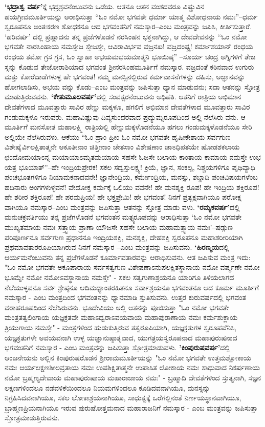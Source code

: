 \textbf{‘ಭದ್ರಾಶ್ವ ವರ್ಷ’}ಕ್ಕೆ ಭದ್ರಶ್ರವನೆಂಬುವನು ಒಡೆಯ. ಆತನೂ ಆತನ ವಂಶದವರೂ ವಿಷ್ಣುವಿನ ಹಯಗ್ರೀವಮೂರ್ತಿಯನ್ನು ಆರಾಧಿಸುತ್ತಾ “ಓಂ ನಮೋ ಭಗವತೇ ಧರ್ಮಾ ಯಾತ್ಮ ವಿಶೋಧನಾಯ ನಮಃ”–ಧರ್ಮ ಸ್ವರೂಪನೂ ಅಂತಃಕರಣ ಶೋಧಕನೂ ಆದ ಭಗವಂತನಿಗೆ ನಮಸ್ಕಾರ–ಎಂಬ ಮಂತ್ರವನ್ನು ಜಪಿಸಿ, ಕೀರ್ತಿಸುತ್ತಾರೆ. ‘ಹರಿವರ್ಷ’ ದಲ್ಲಿ ಪ್ರಹ್ಲಾದನು ತನ್ನ ಪ್ರಜೆಗಳೊಡನೆ ನರಸಿಂಹನ ಭಕ್ತನಾಗಿದ್ದು, ಆ ದೇವದೇವನನ್ನು “ಓಂ ನಮೋ ಭಗವತೇ ನಾರಸಿಂಹಾಯ ನಮಸ್ತೇಜ ಸ್ತೇಜಸ್ತೇ, ಆವಿರಾವಿರ್ಭವ ವಜ್ರನಖ! ವಜ್ರದಂಷ್ಟ್ರ! ಕರ್ಮಾಶಯಾನ್ ರಂಧಯ ರಂಧಯ ತಮೋ ಗ್ರಸ ಗ್ರಸ, ಓಂ ಸ್ವಾಹಾ ಅಭಯಮಭಯಮಾತ್ಮನಿ ಭೂಯಿಷ್ಠ” –ಸೂರ್ಯ ಚಂದ್ರ ಅಗ್ನಿಗಳಿಗೆ ತೇಜ ಸ್ಸನ್ನು ಕೊಡುವ ತೇಜೋರಾಶಿಯಾದ ಭಗವಂತ ಶ್ರೀನರಸಿಂಹಮೂರ್ತಿಗೆ ನಮಸ್ಕಾರ. ವಜ್ರದಂತೆ ಕಠಿನವಾದ ಉಗುರು ಮತ್ತು ಕೋರೆದಾಡೆಗಳುಳ್ಳ ಹೇ ಭಗವಂತ! ನಮ್ಮ ಮನಸ್ಸಿನಲ್ಲಿರುವ ಕರ್ಮವಾಸನೆಗಳನ್ನು ದಹಿಸು, ಅಜ್ಞಾನವನ್ನು ಹೋಗಲಾಡಿಸು, ಅಭಯ ವನ್ನು ಕೊಡು–ಎಂಬ ಮಂತ್ರವನ್ನು ಜಪಿಸುತ್ತಾ ಧ್ಯಾನ ಮಾಡುವನು; ಸದಾ ಆತನನ್ನು ಸ್ತೋತ್ರ ಮಾಡುತ್ತಿರುವವನು. \textbf{‘ಕೇತುಮೂಲವರ್ಷ’}ದಲ್ಲಿ ಸಂವತ್ಸರನೆಂಬುವನು ಅಧಿಪತಿ. ಆತನಿಗೆ ರಾತ್ರಿಯ ಅಭಿಮಾನ ದೇವತೆಗಳಾದ ಮೂವತ್ತಾರು ಸಾವಿರ ಹೆಣ್ಣು ಮಕ್ಕಳೂ, ಹಗಲಿಗೆ ಅಭಿಮಾನ ದೇವತೆಗಳಾದ ಮೂವತ್ತಾರು ಸಾವಿರ ಗಂಡುಮಕ್ಕಳೂ ಇರುವರು. ಮಹಾವಿಷ್ಣುವು ದಿವ್ಯಸುಂದರವಾದ ಪ್ರದ್ಯುಮ್ನರೂಪದಿಂದ ಅಲ್ಲಿ ನೆಲೆಸಿರು ವನು. ಆ ಮೂರ್ತಿಗೆ ಮನಸೋತ ಮಹಾಲಕ್ಷ್ಮಿ ರಾತ್ರಿಯಲ್ಲಿ ಹೆಣ್ಣುಮಕ್ಕಳೊಡನೆಯೂ ಹಗಲು ಗಂಡುಮಕ್ಕಳೊಡನೆಯೂ ಸೇರಿ ಅಲ್ಲಿಯೇ ನೆಲೆಸಿರುವಳು. ಆಕೆಯು “ಓಂ ಹ್ರಾಂ ಹ್ರೀಂ ಓಂ ನಮೋ ಭಗವತೇ ಹೃಷೀಕೇಶಾಯ ಸರ್ವಗುಣ ವಿಶೇಷೈರ್ವಿಲಕ್ಷಿತಾತ್ಮನೇ ಆಕೂತೀನಾಂ ಚಿತ್ತೀನಾಂ ಚೇತಸಾಂ ವಿಶೇಷಣಾಂ ಚಾಽಧಿಪತಯೇ ಷೋಡಶಕಲಾಯ ಛಂದೋಮಯಾಽನ್ನ ಮಯಾಯಾಽಮೃತಮಯಾಯ ಸಹಸೇ ಓಜಸೇ ಬಲಾಯ ಕಾಂತಾಯ ಕಾಮಾಯ ನಮಸ್ತೇ ಉಭ ಯತ್ರ ಭೂಯಾತ್​”–ಹೇ ಇಂದ್ರಿಯಪ್ರೇರಕ! ಸಕಲ ಸದ್ವಸ್ತುಲಕ್ಷ್ಯ! ಕ್ರಿಯೆ, ಜ್ಞಾನ, ಸಂಕಲ್ಪ, ನಿಶ್ಚಯಗಳಿಗೂ ಪೃಥಿವ್ಯಾಧಿ ಪಂಚಭೂತಗಳಿಗೂ ನಿಯಾಮಕನಾದವನೇ! ಜ್ಞಾನೇಂದ್ರಿಯ, ಕರ್ಮೇಂದ್ರಿಯ, ಮನಸ್ಸು, ಶಬ್ದಾದಿ ಪಂಚವಿಷಯಗಳೆಂಬ ಹದಿನಾರು ಅಂಗಗಳುಳ್ಳವನೆ! ವೇದೋಕ್ತ ಕರ್ಮಕ್ಕೆ ಒಲಿಯು ವವನೇ! ಹೇ ಮನಶ್ಶಕ್ತಿ ರೂಪ! ಹೇ ಇಂದ್ರಿಯ ಶಕ್ತಿರೂಪ! ಹೇ ಶರೀರ ಶಕ್ತಿರೂಪ! ಹೇ ಪರಮಪ್ರಿಯ! ಹೇ ಭಕ್ತಪ್ರೇಮಿ! ಹೇ ಭಗವಂತ! ನಿನಗೆ ಪ್ರತ್ಯಕ್ಷವಾಗಿಯೂ ಪರೋಕ್ಷ ವಾಗಿಯೂ ನಮಸ್ಕಾರ–ಎಂಬ ಮಂತ್ರವನ್ನು ಜಪಿಸುತ್ತಾ ಆತನನ್ನು ಸ್ತೋತ್ರ ಮಾಡು ವಳು. \textbf{‘ರಮ್ಯಕವರ್ಷ’}ದಲ್ಲಿ ಮನುಚಕ್ರವರ್ತಿಯು ತನ್ನ ಪ್ರಜೆಗಳೊಡನೆ ಭಗವಂತನ ಮತ್ಸ್ಯರೂಪವನ್ನು ಆರಾಧಿಸುತ್ತಾ ‘ಓಂ ನಮೋ ಭಗವತೇ ಮುಖ್ಯತಮಾಯ ನಮಃ ಸತ್ತ್ವಾಯ ಪ್ರಾಣಾ ಯೌಜಸೇ ಸಹಸೇ ಬಲಾಯ ಮಹಾಮತ್ಸ್ಯಾಯ ನಮಃ’–ಷಡ್ಗುಣ ಪರಿಪೂರ್ಣನೂ ಸರ್ವಗುಣ ಪ್ರಧಾನನೂ ಇಂದ್ರಿಯಶಕ್ತಿ, ಮನಶ್ಶಕ್ತಿ, ದೇಹಶಕ್ತಿ ಸ್ವರೂಪನೂ ಮಹಾಶರೀರಿಯಾಗಿ ಪ್ರಥಮಾವತಾರರೂಪಿಯಾಗಿರುವ ನಿನಗೆ ನಮಸ್ಕಾರ –ಎಂಬ ಮಂತ್ರವನ್ನು ಜಪಿಸುವನು. \textbf{‘ಹಿರಣ್ಮಯ}ದಲ್ಲಿ ಆರ್ಯಮನೆಂಬುವನು ತನ್ನ ಪ್ರಜೆಗಳೊಡನೆ ಕೂರ್ಮಾವತಾರವನ್ನು ಆರಾಧಿಸುವನು. ಆತ ಜಪಿಸುವ ಮಂತ್ರ ಇದು: "ಓಂ ನಮೋ ಭಗವತೇ ಅಕೂಪಾರಾಯ ಸರ್ವಸತ್ವಗುಣ ವಿಶೇಷಣಾಽನುಪಲಕ್ಷಿತಸ್ಥಾನಾಯ ನಮೋ ವರ್ಷ್ಮಣೇ ನಮೋ ಭೂಮ್ನೇ ನಮೋ ನಮೋಽವಸ್ಥಾನಾಯ ನಮಸ್ತೇ" - ಸಕಲ ಸತ್ವಗುಣಾಶ್ರಯನೂ ಯಾರಿಗೂ ತಿಳಿಯಲಾಗದ ನೆಲೆಯುಳ್ಳವನೂ ಸರ್ವ ಶ್ರೇಷ್ಠನೂ ಆದಿಮಧ್ಯಾಂತರಹಿತನೂ ಸರ್ವಾಶ್ರಯನೂ ಭಗವಂತನೂ ಆದ ಕೂರ್ಮ ಮೂರ್ತಿಗೆ ನಮಸ್ಕಾರ - ಎಂಬ ಮಂತ್ರದಿಂದ ಭಗವಂತನನ್ನು ಧ್ಯಾನಮಾಡಿ ಸ್ತುತಿಸುವನು. ಉತ್ತರ ಕುರುವರ್ಷದಲ್ಲಿ ಭಗವಂತ ವರಾಹರೂಪದಿಂದ ನೆಲೆಸಿರುವನು. ಭೂದೇವಿಯು ಅಲ್ಲಿ ಆತನನ್ನು ಪೂಜಿಸುತ್ತಾ "ಓಂ ನಮೋ ಭಗವತೇ ಮಂತ್ರತತ್ವಲಿಂಗಾಯ ಯಜ್ಞಕ್ರತವೇ ಮಹಾಽಧ್ವರಾಽವಯವಾಯ ಮಹಾಪುರಾಣಾಯ ನಮಃ ಕರ್ಮಶುಕ್ಲಾಯ ತ್ರಿಯುಗಾಯ ನಮಸ್ತೇ" - ಮಂತ್ರಗಳಿಂದ ಹುಡುಕುತ್ತಿರುವ ತತ್ವರೂಪಿಯಾಗಿ, ಯಜ್ಞಕ್ರತುಗಳ ಸ್ವರೂಪವೆನಿಸಿ, ಯಜ್ಞಕ್ರತುಗಳೇ ಅವಯವನಾಗಿ ಉಳ್ಳ ಯಜ್ಞಾನುಷ್ಠಾತೃವಾದ, ಯುಗತ್ರಯಸ್ವರೂಪನಾದ ಮಹಾಪುರುಷನಾದ ಭಗವಂತನಿಗೆ ನಮಸ್ಕಾರ - ಎಂಬ ಮಂತ್ರವನ್ನು ಜಪಿಸುತ್ತಾ ಸ್ತೋತ್ರಮಾಡುವಳು. \textbf{'ಕಿಂಪುರುಷವರ್ಷ'}ದಲ್ಲಿ ಆಂಜನೇಯನು ಅಲ್ಲಿನ ಕಿಂಪುರುಷರೊಡನೆ ಶ್ರೀರಾಮಮೂರ್ತಿಯನ್ನು "ಓಂ ನಮೋ ಭಗವತೇ ಉತ್ತಮಶ್ಲೋಕಾಯ ನಮಃ ಆರ್ಯಲಕ್ಷಣಶೀಲವ್ರತಾಯ ನಮಃ ಉಪಶಿಕ್ಷಿತಾತ್ಮನೇ ಉಪಾಸಿತ ಲೋಕಾಯ ನಮಃ ಸಾಧುವಾದ ನಿಕರ್ಷಣಾಯ ನಮೋ ಬ್ರಹ್ಮಣ್ಯದೇವಾಯ ಮಹಾಪುರುಷಾಯ ಮಹಾರಾಜಾಯ ನಮಃ" - ಬ್ರಹ್ಮಾದಿ ದೇವತೆಗಳಿಂದ ಸ್ತುತ್ಯನಾಗಿ, ಸಜ್ಞನ ಲಕ್ಷಣಗಳಿಂದಲೂ ನಡೆವಳಿಕೆಯಿಂದಲೂ ನಿಯಮಗಳಿಂದಲೂ ಕೂಡಿದವನಾಗಿಯೂ, ಮನಸ್ಸನ್ನು ನಿಗ್ರಹಿಸಿದವನಾಗಿಯೂ, ಸಕಲ ಲೋಕಾಶ್ರಯನಾಗಿಯೂ, ಸಾಧುತ್ವಕ್ಕೆ ಒರೆಗಲ್ಲಿನಂತೆ ನಿರ್ಣಯಸ್ಥಾನವಾಗಿಯೂ, ಬ್ರಾಹ್ಮಣಪ್ರಿಯನಾಗಿಯೂ ಇರುವ ಪುರುಷೋತ್ತಮನಾದ ಮಹಾರಾಜನಿಗೆ ನಮಸ್ಕಾರ - ಎಂಬ ಮಂತ್ರವನ್ನು ಜಪಿಸುತ್ತಾ ಸ್ತೋತ್ರಮಾಡುತ್ತಿರುವನು.

